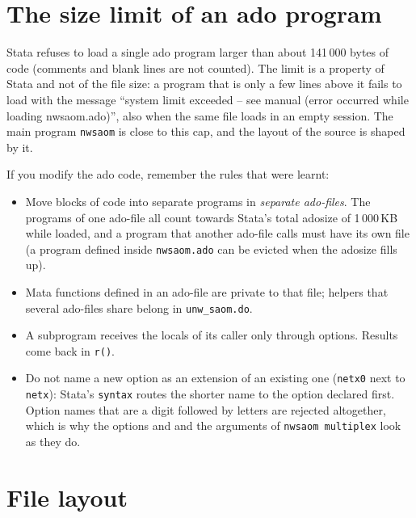\section{The size limit of an ado program}

Stata refuses to load a single ado program larger than about 141\,000 bytes of code (comments and blank lines are not counted). The limit is a property of Stata and not of the file size: a program that is only a few lines above it fails to load with the message ``system limit exceeded -- see manual (error occurred while loading nwsaom.ado)'', also when the same file loads in an empty session. The main program \texttt{nwsaom} is close to this cap, and the layout of the source is shaped by it.

If you modify the ado code, remember the rules that were learnt:
\begin{itemize}[nosep]
  \item Move blocks of code into separate programs in \emph{separate ado-files}. The programs of one ado-file all count towards Stata's total adosize of 1\,000\,KB while loaded, and a program that another ado-file calls must have its own file (a program defined inside \texttt{nwsaom.ado} can be evicted when the adosize fills up).
  \item Mata functions defined in an ado-file are private to that file; helpers that several ado-files share belong in \texttt{unw\_saom.do}.
  \item A subprogram receives the locals of its caller only through options. Results come back in \texttt{r()}.
  \item Do not name a new option as an extension of an existing one (\texttt{netx0} next to \texttt{netx}): Stata's \texttt{syntax} routes the shorter name to the option declared first. Option names that are a digit followed by letters are rejected altogether, which is why the options  and  and the arguments of \texttt{nwsaom multiplex} look as they do.
\end{itemize}

\section{File layout}

